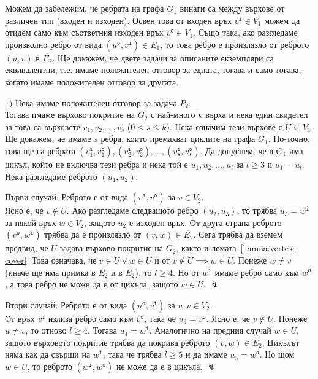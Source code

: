 \documentclass[12pt,twoside,a4paper]{article}
\begin{document}
\begin{theorem}
		Можем да забележим, че ребрата на графа $G_1$ винаги са между върхове от различен тип (входен и изходен). Освен това от входен връх $v^\texttt{i} \in V_1$ можем да отидем само към съответния изходен връх $v^\texttt{o} \in V_1$. Също така, ако разгледаме произволно ребро от вида $(u^\texttt{o}, v^\texttt{i}) \in E_1$, то това ребро е произлязло от реброто $(u,v)$ в $\overline{E_2}$. Ще докажем, че двете задачи за описаните екземпляри са еквивалентни, т.е. имаме положителен отговор за едната, тогава и само тогава, когато имаме положителен отговор за другата.
		
		$1)$ Нека имаме положителен отговор за задача $P_2$.\\
		Тогава имаме върхово покритие на $G_2$ с най-много $k$ върха и нека един свидетел за това са върховете $v_1, v_2, \dots, v_s$ ($0 \le s \le k$). Нека означим тези върхове с $U \subseteq V_1$. Ще докажем, че имаме $s$ ребра, които премахват циклите на графа $G_1$. По-точно, това ще са ребрата $(v_1^\texttt{i}, v_1^\texttt{o}), (v_2^\texttt{i}, v_2^\texttt{o}), \dots, (v_s^\texttt{i}, v_s^\texttt{o})$. Да допуснем, че в $G_1$ има цикъл, който не включва тези ребра и нека той е $u_1, u_2, \dots, u_l$ за $l \ge 3$ и $u_1=u_l$. Нека разгледаме реброто $(u_1, u_2)$.
		
		Първи случай: Реброто е от вида $(v^\texttt{i}, v^\texttt{o})$ за $v \in V_2$.\\
		Ясно е, че $v \notin U$. Ако разгледаме следващото ребро $(u_2, u_3)$, то трябва $u_3 = w^\texttt{i}$ за някой връх $w \in V_2$, защото $u_2$ е изходен връх. От друга страна реброто $(v^\texttt{o}, w^\texttt{i})$ трябва да е произлязло от $(v,w) \in \overline{E_2}$. Сега трябва да вземем предвид, че $U$ задава върхово покритие на $G_2$, както и лемата~\ref{lemma:vertex-cover}. Това означава, че $v \in U \lor w \in U$ и от $v \notin U \implies w \in U$. Понеже $w \neq v$ (иначе ще има примка в $\overline{E_2}$ и в $E_2$), то $l \ge 4$. Но от $w^\texttt{i}$ имаме ребро само към $w^\texttt{o}$, а това ребро не може да е от цикъла, защото $w \in U$. $\lightning$
		
		Втори случай: Реброто е от вида $(u^\texttt{o}, v^\texttt{i})$ за $u, v \in V_2$.\\
		От връх $v^\texttt{i}$ излиза ребро само към $v^\texttt{o}$, така че $u_3 = v^\texttt{o}$. Ясно е, че $v \notin U$. Понеже $u \neq v$, то отново $l \ge 4$. Тогава $u_4 = w^\texttt{i}$. Аналогично на предния случай $w \in U$, защото върховото покритие трябва да покрива реброто $(v,w) \in \overline{E_2}$. Цикълът няма как да свърши на $w^\texttt{i}$, така че трябва $l \ge 5$ и да имаме $u_5 = w^\texttt{o}$. Но щом $w \in U$, то реброто $(w^\texttt{i}, w^\texttt{o})$ не може да е в цикъла. $\lightning$
		

\end{theorem}
\end{document}
